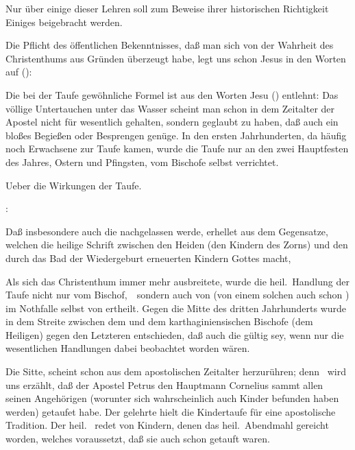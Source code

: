 Nur über einige dieser Lehren soll zum Beweise ihrer historischen Richtigkeit Einiges beigebracht werden.
\begin{aufza}
\item Die Pflicht des öffentlichen Bekenntnisses, daß man sich von der Wahrheit des Christenthums aus Gründen überzeugt habe, legt uns schon Jesus in den Worten auf (): 
\item Die bei der Taufe gewöhnliche Formel ist aus den Worten Jesu () entlehnt:  Das völlige Untertauchen unter das Wasser scheint man schon in dem Zeitalter der Apostel nicht für wesentlich gehalten, sondern geglaubt zu haben, daß auch ein bloßes Begießen oder Besprengen genüge. In den ersten Jahrhunderten, da häufig noch Erwachsene zur Taufe kamen, wurde die Taufe nur an den zwei Hauptfesten des Jahres, Ostern und Pfingsten, vom Bischofe selbst verrichtet.
\item Ueber die Wirkungen der Taufe.
\begin{aufzb}
\item {}: 
\item Daß insbesondere auch die  nachgelassen werde, erhellet aus dem Gegensatze, welchen die heilige Schrift zwischen den Heiden (den Kindern des Zorns) und den durch das Bad der Wiedergeburt erneuerten Kindern Gottes macht, \usw\
\end{aufzb}
\item Als sich das Christenthum immer mehr ausbreitete, wurde die heil.\ Handlung der Taufe nicht nur vom Bischof,~\ sondern auch von  (von einem solchen auch schon ) im Nothfalle selbst von  ertheilt. Gegen die Mitte des dritten Jahrhunderts wurde in dem Streite zwischen dem  und dem karthaginiensischen Bischofe  (dem Heiligen) gegen den Letzteren entschieden, daß auch die  gültig sey, wenn nur die wesentlichen Handlungen dabei beobachtet worden wären.
\item Die Sitte, \RWbet{Kinder zu taufen,} scheint schon aus dem apostolischen Zeitalter herzurühren; denn \RWbibel{Apg}{Apostelg.}{10}{44\,ff}\ wird uns erzählt, daß der Apostel Petrus den Hauptmann Cornelius sammt allen seinen Angehörigen (worunter sich wahrscheinlich auch Kinder befunden haben werden) getaufet habe. Der gelehrte \RWbet{Origenes} hielt die Kindertaufe für eine apostolische Tradition. Der heil.\ \RWbet{Cyprian} redet von Kindern, denen das heil.\ Abendmahl gereicht worden, welches voraussetzt, daß sie auch schon getauft waren.

\end{aufza}
